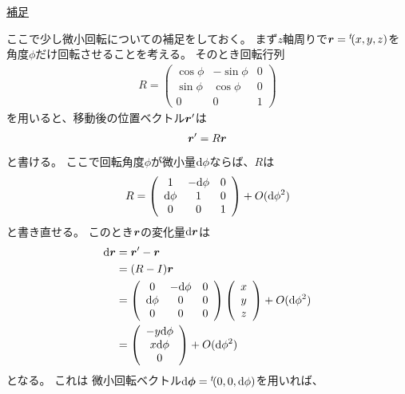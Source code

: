 \documentclass[a4paper]{jsarticle}
\def\vec#1{\mbox{\boldmath $#1$}}
\newcommand{\ddif}{{\rm d}}
\begin{document}
\begin{screen}
	\underline{補足}

	ここで少し微小回転についての補足をしておく。
	まず$z$軸周りで$\vec{r} = {}^t\!(x, y, z)$を角度$\phi$だけ回転させることを考える。
	そのとき回転行列
	\begin{align}
		R = \left( 
			\begin{array}{ccc}
				\cos \phi & -\sin \phi & 0 \\
				\sin \phi & \cos \phi & 0 \\
				0 & 0 & 1
			\end{array}
		 \right)
	\end{align}
	を用いると、移動後の位置ベクトル$\vec{r}^{\prime}$は
	\begin{align}
		\vec{r}^{\prime} = R \vec{r}
	\end{align}
	と書ける。
	ここで回転角度$\phi$が微小量$\ddif \phi$ならば、$R$は
	\begin{align}
		R = \left( 
			\begin{array}{ccc}
				1 & -\ddif \phi & 0 \\
				\ddif \phi & 1 & 0 \\
				0 & 0 & 1
			\end{array}
		 \right) + O(\ddif \phi^2)
	\end{align}
	と書き直せる。
	このとき$\vec{r}$の変化量$\ddif \vec{r}$は
	\begin{align}
		\ddif \vec{r} &= \vec{r}^{\prime} - \vec{r} \\
		&= (R - I) \vec{r} \\
		&= \left( 
			\begin{array}{ccc}
				0 & -\ddif \phi & 0 \\
				\ddif \phi & 0 & 0 \\
				0 & 0 & 0
			\end{array}
			\right) \left(
				\begin{array}{c}
					x \\ y \\ z
				\end{array}
			\right) + O(\ddif \phi^2) \\
		&= \left(
			\begin{array}{c}
				-y \ddif \phi \\ x \ddif \phi \\ 0
			\end{array}
		\right) + O(\ddif \phi^2)
	\end{align}
	となる。
	これは
	微小回転ベクトル$\ddif \vec{\phi} = {}^t\!(0, 0, \ddif \phi)$を用いれば、

\end{screen}
\end{document}
